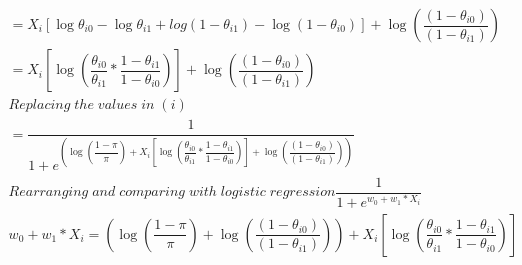 \begin{enumerate}
\begin{align*}
	={X_i} \left[ \log{\theta_{i0}} - \log{\theta_{i1}} + log{(1-\theta_{i1})} - \log{(1- \theta_{i0})} \right] + \log{\left( \dfrac{(1-\theta_{i0})}{(1-\theta_{i1})} \right)} \\
	={X_i} \left[ \log{\left( \dfrac{\theta_{i0}}{\theta_{i1}} * \dfrac{1- \theta_{i1}}{1- \theta_{i0}}\right) } \right] + \log{\left( \dfrac{(1-\theta_{i0})}{(1-\theta_{i1})} \right)} \\
	Replacing \; the \; values \; in \; (i) \\
	=  \dfrac{1}{1 + e^{\left(\log{\left(\dfrac{1-\pi} {\pi}\right)} + {X_i} \left[ \log{\left( \dfrac{\theta_{i0}}{\theta_{i1}} * \dfrac{1- \theta_{i1}}{1- \theta_{i0}}\right) } \right] + \log{\left( \dfrac{(1-\theta_{i0})}{(1-\theta_{i1})} \right)}  \right)}} \\
	Rearranging \; and \; comparing \; with\; logistic \; regression \dfrac{1}{1+e^{w_0 + w_1*X_i}}\\
	w_0 + w_1*X_i =   {\left(\log{\left(\dfrac{1-\pi} {\pi}\right)} + \log{\left( \dfrac{(1-\theta_{i0})}{(1-\theta_{i1})} \right)}  \right) + {X_i} \left[ \log{\left( \dfrac{\theta_{i0}}{\theta_{i1}} * \dfrac{1- \theta_{i1}}{1- \theta_{i0}}\right) } \right] } \\
\end{align*}
\end{enumerate}
